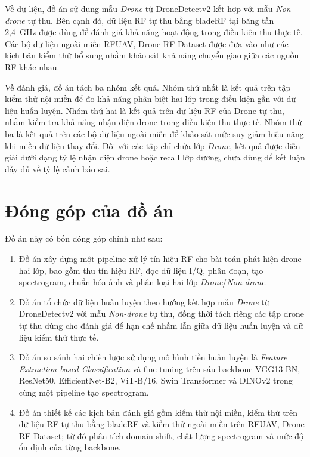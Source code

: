 \documentclass[../DoAn.tex]{subfiles}
\begin{document}
Về dữ liệu, đồ án sử dụng mẫu \textit{Drone} từ DroneDetectv2 kết hợp với mẫu \textit{Non-drone} tự thu. Bên cạnh đó, dữ liệu RF tự thu bằng bladeRF tại băng tần 2,4~GHz được dùng để đánh giá khả năng hoạt động trong điều kiện thu thực tế. Các bộ dữ liệu ngoài miền RFUAV, Drone RF Dataset được đưa vào như các kịch bản kiểm thử bổ sung nhằm khảo sát khả năng chuyển giao giữa các nguồn RF khác nhau.

Về đánh giá, đồ án tách ba nhóm kết quả. Nhóm thứ nhất là kết quả trên tập kiểm thử nội miền để đo khả năng phân biệt hai lớp trong điều kiện gần với dữ liệu huấn luyện. Nhóm thứ hai là kết quả trên dữ liệu RF của Drone tự thu, nhằm kiểm tra khả năng nhận diện drone trong điều kiện thu thực tế. Nhóm thứ ba là kết quả trên các bộ dữ liệu ngoài miền để khảo sát mức suy giảm hiệu năng khi miền dữ liệu thay đổi. Đối với các tập chỉ chứa lớp \textit{Drone}, kết quả được diễn giải dưới dạng tỷ lệ nhận diện drone hoặc recall lớp dương, chưa dùng để kết luận đầy đủ về tỷ lệ cảnh báo sai.

\section{Đóng góp của đồ án}

Đồ án này có bốn đóng góp chính như sau:

\begin{enumerate}
    \item Đồ án xây dựng một pipeline xử lý tín hiệu RF cho bài toán phát hiện drone hai lớp, bao gồm thu tín hiệu RF, đọc dữ liệu I/Q, phân đoạn, tạo spectrogram, chuẩn hóa ảnh và phân loại hai lớp \textit{Drone}/\textit{Non-drone}.

    \item Đồ án tổ chức dữ liệu huấn luyện theo hướng kết hợp mẫu \textit{Drone} từ DroneDetectv2 với mẫu \textit{Non-drone} tự thu, đồng thời tách riêng các tập drone tự thu dùng cho đánh giá để hạn chế nhầm lẫn giữa dữ liệu huấn luyện và dữ liệu kiểm thử thực tế.

    \item Đồ án so sánh hai chiến lược sử dụng mô hình tiền huấn luyện là \textit{Feature Extraction-based Classification} và fine-tuning trên sáu backbone VGG13-BN, ResNet50, EfficientNet-B2, ViT-B/16, Swin Transformer và DINOv2 trong cùng một pipeline tạo spectrogram.

    \item Đồ án thiết kế các kịch bản đánh giá gồm kiểm thử nội miền, kiểm thử trên dữ liệu RF tự thu bằng bladeRF và kiểm thử ngoài miền trên RFUAV, Drone RF Dataset; từ đó phân tích domain shift, chất lượng spectrogram và mức độ ổn định của từng backbone.
\end{enumerate}
\end{document}
